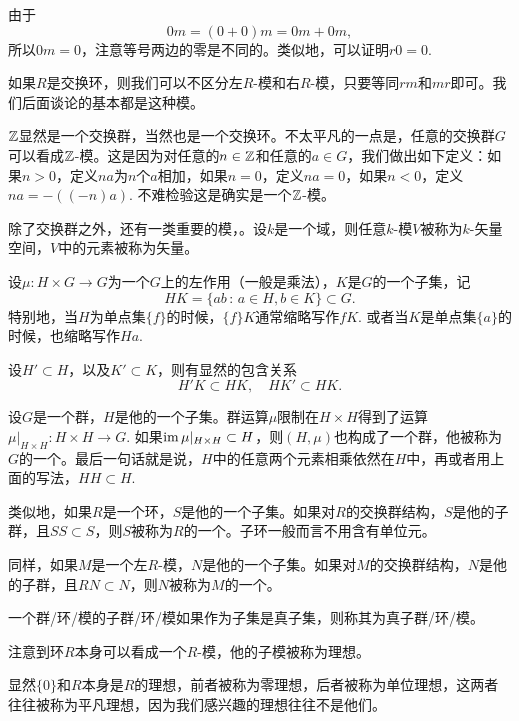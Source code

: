 由于
\[
	0m=(0+0)m=0m+0m,
\]
所以$0m=0$，注意等号两边的零是不同的。类似地，可以证明$r0=0$. 

如果$R$是交换环，则我们可以不区分左$R$-模和右$R$-模，只要等同$rm$和$mr$即可。我们后面谈论的基本都是这种模。

\para $\mathbb{Z}$显然是一个交换群，当然也是一个交换环。不太平凡的一点是，任意的交换群$G$可以看成$\mathbb{Z}$-模。这是因为对任意的$n\in \mathbb{Z}$和任意的$a\in G$，我们做出如下定义：如果$n>0$，定义$na$为$n$个$a$相加，如果$n=0$，定义$na=0$，如果$n<0$，定义$na=-((-n)a)$. 不难检验这是确实是一个$\mathbb{Z}$-模。

除了交换群之外，还有一类重要的模，。设$k$是一个域，则任意$k$-模$V$被称为$k$-矢量空间，$V$中的元素被称为矢量。

\para 设$\mu:H\times G\to G$为一个$G$上的左作用（一般是乘法），$K$是$G$的一个子集，记
\[
	HK=\{ab\,:\,a\in H,b\in K\}\subset G.
\]
特别地，当$H$为单点集$\{f\}$的时候，$\{f\}K$通常缩略写作$fK$. 或者当$K$是单点集$\{a\}$的时候，也缩略写作$Ha$.

设$H'\subset H$，以及$K'\subset K$，则有显然的包含关系
\[
	H'K\subset HK,\quad HK'\subset HK.
\]


\para 设$G$是一个群，$H$是他的一个子集。群运算$\mu$限制在$H\times H$得到了运算$\mu|_{H\times H}:H\times H\to G$. 如果$\operatorname{im}\mu|_{H\times H}\subset H$，则$(H,\mu)$也构成了一个群，他被称为$G$的一个。最后一句话就是说，$H$中的任意两个元素相乘依然在$H$中，再或者用上面的写法，$HH\subset H$.

类似地，如果$R$是一个环，$S$是他的一个子集。如果对$R$的交换群结构，$S$是他的子群，且$SS\subset S$，则$S$被称为$R$的一个。子环一般而言不用含有单位元。

同样，如果$M$是一个左$R$-模，$N$是他的一个子集。如果对$M$的交换群结构，$N$是他的子群，且$RN\subset N$，则$N$被称为$M$的一个。

一个群/环/模的子群/环/模如果作为子集是真子集，则称其为真子群/环/模。

\para 注意到环$R$本身可以看成一个$R$-模，他的子模被称为理想。

显然$\{0\}$和$R$本身是$R$的理想，前者被称为零理想，后者被称为单位理想，这两者往往被称为平凡理想，因为我们感兴趣的理想往往不是他们。

